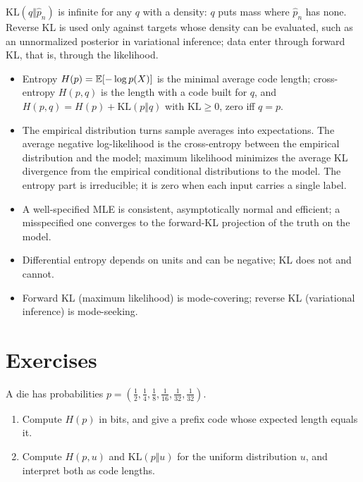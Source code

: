 \begin{notechapter}
\begin{pitfall}
$\mathrm{KL}(q\Vert\hat p_n)$ is infinite for any $q$ with a density: $q$ puts mass where $\hat p_n$ has
none. Reverse KL is used only against targets whose density can be evaluated,
such as an unnormalized posterior in variational inference; data enter through
forward KL, that is, through the likelihood.
\end{pitfall}

\begin{chaptersummary}
\begin{itemize}[nosep]
  \item Entropy $H(p) = \mathbb{E}[-\log p(X)]$ is the minimal average code length; cross-entropy
        $H(p, q)$ is the length with a code built for $q$, and
        $H(p, q) = H(p) + \mathrm{KL}(p\Vert q)$ with $\mathrm{KL}\geq0$, zero iff $q = p$.
  \item The empirical distribution turns sample averages into expectations. The
        average negative log-likelihood is the cross-entropy between the empirical
        distribution and the model; maximum likelihood minimizes the average KL
        divergence from the empirical conditional distributions to the model. The
        entropy part is irreducible; it is zero when each input carries a single
        label.
  \item A well-specified MLE is consistent, asymptotically normal and efficient; a
        misspecified one converges to the forward-KL projection of the truth on the
        model.
  \item Differential entropy depends on units and can be negative; KL does not and
        cannot.
  \item Forward KL (maximum likelihood) is mode-covering; reverse KL (variational
        inference) is mode-seeking.
\end{itemize}
\end{chaptersummary}

\section*{Exercises}

\begin{exercise}\label{cross-entropy:exr:1}
A die has probabilities $p = (\frac12, \frac14, \frac18, \frac1{16}, \frac1{32}, \frac1{32})$.
\begin{enumerate}[nosep]
  \item Compute $H(p)$ in bits, and give a prefix code whose expected length equals it.
  \item Compute $H(p, u)$ and $\mathrm{KL}(p\Vert u)$ for the uniform distribution $u$, and interpret
        both as code lengths.
\end{enumerate}
\end{exercise}


\end{notechapter}
